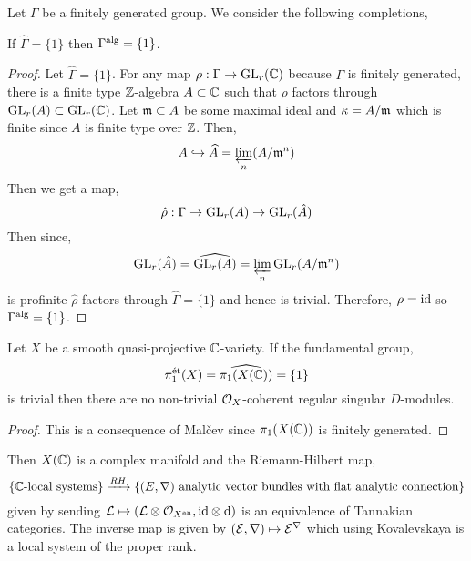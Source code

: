 \documentclass[12pt]{article}
\begin{document}
Let $\Gamma$ be a finitely generated group. We consider the following completions,
\begin{center}
\end{center}

\begin{theorem}[Mal\v{c}ev, 1940]
If $\widehat{\Gamma} = \{ 1 \}$ then $\Gamma^{\mathrm{alg}} = \{ 1 \}$.
\end{theorem}

\begin{proof}
Let $\widehat{\Gamma} = \{ 1 \}$. For any map $\rho : \Gamma \to \mathrm{GL}_r(\mathbb{C})$ because $\Gamma$ is finitely generated, there is a finite type $\mathbb{Z}$-algebra $A \subset \mathbb{C}$ such that $\rho$ factors through $\mathrm{GL}_r(A) \subset \mathrm{GL}_r(\mathbb{C})$. Let $\mathfrak{m} \subset A$ be some maximal ideal and $\kappa = A / \mathfrak{m}$ which is finite since $A$ is finite type over $\mathbb{Z}$. Then,
\[ A \hookrightarrow \widehat{A} = \varprojlim_n (A / \mathfrak{m}^n) \]
Then we get a map,
\[ \hat{\rho} : \Gamma \to \mathrm{GL}_r(A) \to \mathrm{GL}_r(\hat{A}) \]
Then since,
\[ \mathrm{GL}_r(\hat{A}) = \widehat{\mathrm{GL}_r(A)} = \varprojlim_{n} \mathrm{GL}_r(A/\mathfrak{m}^n) \]
is profinite $\hat{\rho}$ factors through $\widehat{\Gamma} = \{ 1 \}$ and hence is trivial. Therefore, $\rho = \mathrm{id}$ so $\Gamma^{\mathrm{alg}} = \{ 1 \}$.  
\end{proof}

\begin{theorem}[Grothendieck]
Let $X$ be a smooth quasi-projective $\mathbb{C}$-variety. If the \etale fundamental group,
\[ \pi_1^{\text{\'{e}t}}(X) = \widehat{\pi_1(X(\mathbb{C}))} = \{ 1 \} \]
is trivial then there are no non-trivial $\mathcal{O}_{X}$-coherent regular singular $D$-modules.
\end{theorem}

\begin{proof}
This is a consequence of Mal\v{c}ev since $\pi_1(X(\mathbb{C}))$ is finitely generated. 
\end{proof}

\begin{rmk}
Then $X(\mathbb{C})$ is a complex manifold and the Riemann-Hilbert map,
\[ \{ \mathbb{C}\text{-local systems} \} \xrightarrow{RH} \{ (E, \nabla) \text{ analytic vector bundles with flat analytic connection} \} \]
given by sending $\mathcal{L} \mapsto (\mathcal{L} \otimes \mathcal{O}_{X^{\mathrm{an}}}, \mathrm{id} \otimes \mathrm{d})$ is an equivalence of Tannakian categories. The inverse map is given by $(\mathcal{E}, \nabla) \mapsto \mathcal{E}^{\nabla}$ which using Kovalevskaya is a local system of the proper rank.
\end{rmk}
\end{document}
